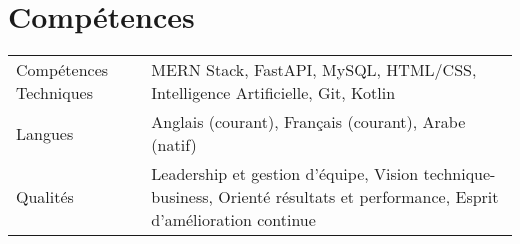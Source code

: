 \documentclass[a4paper,11pt]{article}
\begin{document}
\section{Compétences}
\begin{tabularx}{\linewidth}{@{}l X@{}}
Compétences Techniques & \normalsize{MERN Stack, FastAPI, MySQL, HTML/CSS, Intelligence Artificielle, Git, Kotlin}\\
Langues & \normalsize{Anglais (courant), Français (courant), Arabe (natif)}\\
Qualités & \normalsize{Leadership et gestion d'équipe, Vision technique-business, Orienté résultats et performance, Esprit d'amélioration continue}\\
\end{tabularx}
\end{document}
